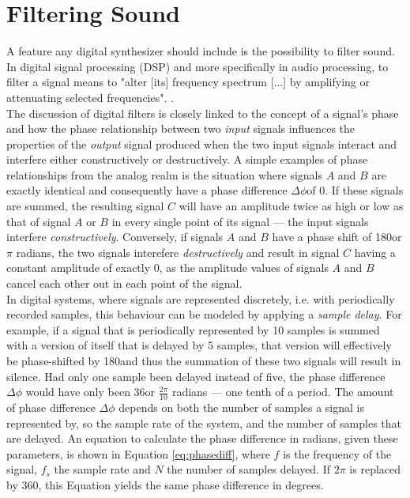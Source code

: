 \chapter{Filtering Sound}

A feature any digital synthesizer should include is the possibility to filter sound. In digital signal processing (DSP) and more specifically in audio processing, to filter a signal means to "alter [its] frequency spectrum [...] by amplifying or attenuating selected frequencies". .\\

\noindent The discussion of digital filters is closely linked to the concept of a signal's phase and how the phase relationship between two \emph{input} signals influences the properties of the \emph{output} signal produced when the two input signals interact and interfere either constructively or destructively. A simple examples of phase relationships from the analog realm is the situation where signals $A$ and $B$ are exactly identical and consequently have a phase difference $\Delta \phi$of $0$. If these signals are summed, the resulting signal $C$ will have an amplitude twice as high or low as that of signal $A$ or $B$ in every single point of its signal --- the input signals interfere \emph{constructively}. Conversely, if signals $A$ and $B$ have a phase shift of 180\degree or $\pi$ radians, the two signals interefere \emph{destructively} and result in signal $C$ having a constant amplitude of exactly $0$, as the amplitude values of signals $A$ and $B$ cancel each other out in each point of the signal.\\

\noindent In digital systems, where signals are represented discretely, i.e. with periodically recorded samples, this behaviour can be modeled by applying a \emph{sample delay}.  For example, if a signal that is periodically represented by 10 samples is summed with a version of itself that is delayed by 5 samples, that version will effectively be phase-shifted by 180\degree and thus the summation of these two signals will result in silence. Had only one sample been delayed instead of five, the phase difference $\Delta \phi$ would have only been 36\degree or $\frac{2\pi}{10}$ radians --- one tenth of a period. The amount of phase difference $\Delta \phi$ depends on both the number of samples a signal is represented by, so the sample rate of the system, and the number of samples that are delayed. An equation to calculate the phase difference in radians, given these parameters, is shown in Equation \ref{eq:phasediff}, where $f$ is the frequency of the signal, $f_{s}$ the sample rate and $N$ the number of samples delayed. If $2\pi$ is replaced by 360, this Equation yields the same phase difference in degrees.\\

